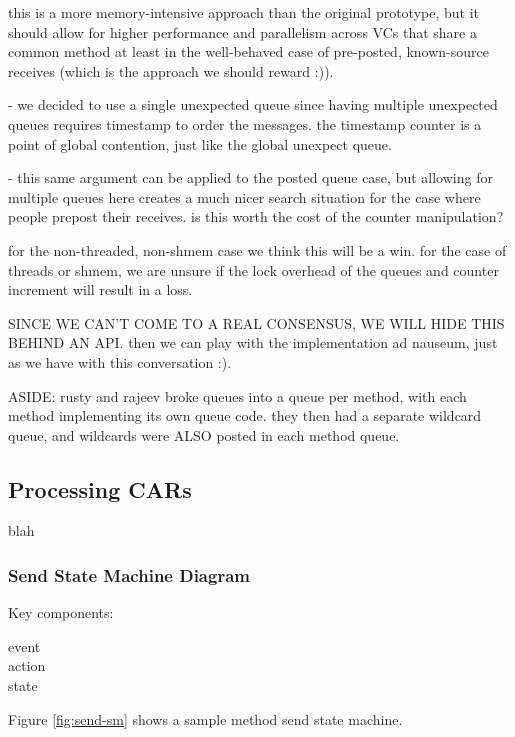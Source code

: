 \documentclass[11pt,letterpaper]{article}
\begin{document}
this is a more memory-intensive approach than the original prototype, but it
should allow for higher performance and parallelism across VCs that share a
common method at least in the well-behaved case of pre-posted, known-source
receives (which is the approach we should reward :)).

- we decided to use a single unexpected queue since having multiple unexpected
  queues requires timestamp to order the messages.  the timestamp counter is a
  point of global contention, just like the global unexpect queue.

- this same argument can be applied to the posted queue case, but allowing for
  multiple queues here creates a much nicer search situation for the case where
  people prepost their receives.  is this worth the cost of the counter
  manipulation?

  for the non-threaded, non-shmem case we think this will be a win.  for the
  case of threads or shmem, we are unsure if the lock overhead of the queues
  and counter increment will result in a loss.

  SINCE WE CAN'T COME TO A REAL CONSENSUS, WE WILL HIDE THIS BEHIND AN API.
  then we can play with the implementation ad nauseum, just as we have with
  this conversation :).

ASIDE:
  rusty and rajeev broke queues into a queue per method, with each method
  implementing its own queue code.  they then had a separate wildcard queue,
  and wildcards were ALSO posted in each method queue.

%
%


%
%
\subsection{Processing CARs}

blah

%
%
\subsubsection{Send State Machine Diagram}

Key components:
\begin{description}
\item[event]
\item[action]
\item[state]
\end{description}

Figure \ref{fig:send-sm} shows a sample method send state machine.
\end{document}
